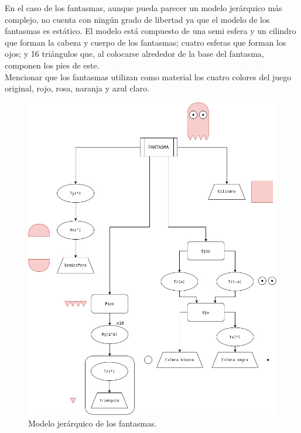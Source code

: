 \newpage

En el caso de los fantasmas, aunque pueda parecer un modelo jerárquico más complejo, no cuenta con ningún grado de libertad ya que el modelo de los fantasmas es estático. El modelo está compuesto de una semi esfera y un cilindro que forman la cabeza y cuerpo de los fantasmas; cuatro esferas que forman los ojos; y 16 triángulos que, al colocarse alrededor de la base del fantasma, componen los pies de este.\\

Mencionar que los fantasmas utilizan como material los cuatro colores del juego original, rojo, rosa, naranja y azul claro.

\begin{figure}[H]
    \begin{center}
        \includegraphics[scale=0.41]{img/fantasma_jerarquico.png}
        \caption{Modelo jerárquico de los fantasmas.}
    \end{center}
\end{figure}